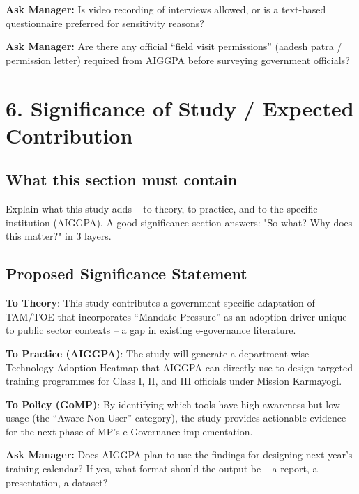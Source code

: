 \documentclass[12pt,a4paper]{article}
\newcommand{\managerQ}[1]{%
  \begin{tcolorbox}[colback=govgold!10,colframe=govgold,boxrule=0.5pt,arc=2mm,
    left=4pt,right=4pt,top=2pt,bottom=2pt]
    \small\textbf{Ask Manager:} #1
  \end{tcolorbox}
}
\begin{document}
\managerQ{Is video recording of interviews allowed, or is a text-based questionnaire preferred for sensitivity reasons?}

\managerQ{Are there any official ``field visit permissions'' (aadesh patra / permission letter) required from AIGGPA before surveying government officials?}

\vspace{0.4cm}

\section{6. Significance of Study / Expected Contribution}

\subsection{What this section must contain}
Explain what this study adds -- to theory, to practice, and to the specific institution (AIGGPA). A good significance section answers: "So what? Why does this matter?" in 3 layers.

\subsection{Proposed Significance Statement}

\begin{tcolorbox}[colback=govblue!5,colframe=govblue,arc=2mm]
\small
\textbf{To Theory}: This study contributes a government-specific adaptation of TAM/TOE that incorporates ``Mandate Pressure'' as an adoption driver unique to public sector contexts -- a gap in existing e-governance literature.

\textbf{To Practice (AIGGPA)}: The study will generate a department-wise Technology Adoption Heatmap that AIGGPA can directly use to design targeted training programmes for Class I, II, and III officials under Mission Karmayogi.

\textbf{To Policy (GoMP)}: By identifying which tools have high awareness but low usage (the ``Aware Non-User'' category), the study provides actionable evidence for the next phase of MP's e-Governance implementation.
\end{tcolorbox}

\managerQ{Does AIGGPA plan to use the findings for designing next year's training calendar? If yes, what format should the output be -- a report, a presentation, a dataset?}
\end{document}
